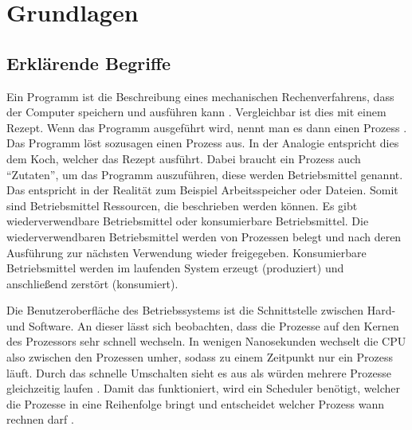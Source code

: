 \chapter{Grundlagen}
\label{grundlagen}
\section{Erklärende Begriffe}
\label{sec:begriffe}
Ein Programm ist die Beschreibung eines mechanischen Rechenverfahrens, dass der Computer speichern und ausführen kann \parencite[vgl.][14]{rechenberg2000}. Vergleichbar ist dies mit einem Rezept. Wenn das Programm ausgeführt wird, nennt man es dann einen Prozess \parencite[vgl.][S.71]{tanenbaum2016}. Das Programm löst sozusagen einen Prozess aus. In der Analogie entspricht dies dem Koch, welcher das Rezept ausführt. Dabei braucht ein Prozess auch “Zutaten”, um das Programm auszuführen, diese werden Betriebsmittel genannt. Das entspricht in der Realität zum Beispiel Arbeitsspeicher oder Dateien. Somit sind Betriebsmittel Ressourcen, die beschrieben werden können. Es gibt wiederverwendbare Betriebsmittel oder konsumierbare Betriebsmittel. Die wiederverwendbaren Betriebsmittel werden von Prozessen belegt und nach deren Ausführung zur nächsten Verwendung  wieder freigegeben. Konsumierbare Betriebsmittel werden im laufenden System erzeugt (produziert) und anschließend zerstört (konsumiert).


Die Benutzeroberfläche des Betriebssystems ist die Schnittstelle zwischen Hard- und Software. An dieser lässt sich beobachten, dass die Prozesse auf den Kernen des Prozessors sehr schnell wechseln. In wenigen Nanosekunden wechselt die CPU also zwischen den Prozessen umher, sodass zu einem Zeitpunkt nur ein Prozess läuft. Durch das schnelle Umschalten sieht es aus als würden mehrere Prozesse gleichzeitig laufen \parencite[vgl.][S.466]{sommer2002}. Damit  das funktioniert, wird ein Scheduler benötigt, welcher die Prozesse in eine Reihenfolge bringt und entscheidet welcher Prozess wann rechnen darf \parencite[vgl.][S.199]{tanenbaum2016}.

